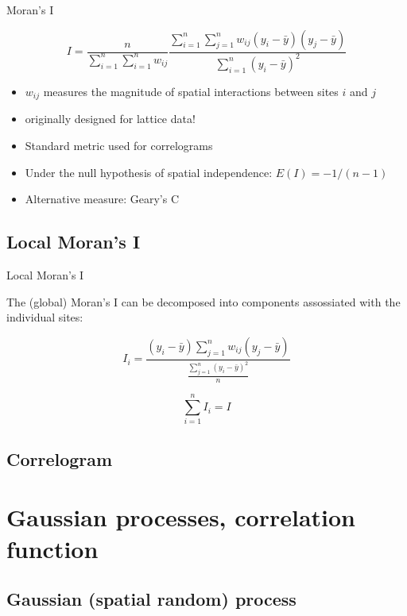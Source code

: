 \documentclass[
  ignorenonframetext,
]{beamer}
\providecommand{\tightlist}{%
  \setlength{\itemsep}{0pt}\setlength{\parskip}{0pt}}
\begin{document}
\begin{frame}{Moran's I}
\small

\[I=\frac{n}{\sum_{i=1}^n \sum_{i=1}^n w_{ij}} \frac{\sum_{i=1}^n \sum_{j=1}^n w_{ij} (y_i-\bar{y})(y_j-\bar{y})}{\sum_{i=1}^n(y_i-\bar{y})^2}\]

\begin{itemize}
\tightlist
\item
  \(w_{ij}\) measures the magnitude of spatial interactions between
  sites \(i\) and \(j\)
\item
  originally designed for lattice data!
\item
  Standard metric used for correlograms
\item
  Under the null hypothesis of spatial independence:
  \(E(I) = -1 / (n-1)\)
\item
  Alternative measure: Geary's C
\end{itemize}
\end{frame}

\hypertarget{local-morans-i}{%
\subsection{Local Moran's I}\label{local-morans-i}}

\begin{frame}{Local Moran's I}
\small

The (global) Moran's I can be decomposed into components assossiated
with the individual sites:

\[I_i = \frac{(y_i - \bar{y}) \sum_{j=1}^n w_{ij}(y_j-\bar{y})}{\frac{\sum_{j=1}^n(y_i-\bar{y})^2}{n}}\]

\[\sum_{i=1}^nI_i = I\]
\end{frame}

\hypertarget{correlogram}{%
\subsection{Correlogram}\label{correlogram}}

\hypertarget{gaussian-processes-correlation-function}{%
\section{Gaussian processes, correlation
function}\label{gaussian-processes-correlation-function}}

\hypertarget{gaussian-spatial-random-process}{%
\subsection{Gaussian (spatial random)
process}\label{gaussian-spatial-random-process}}
\end{document}
